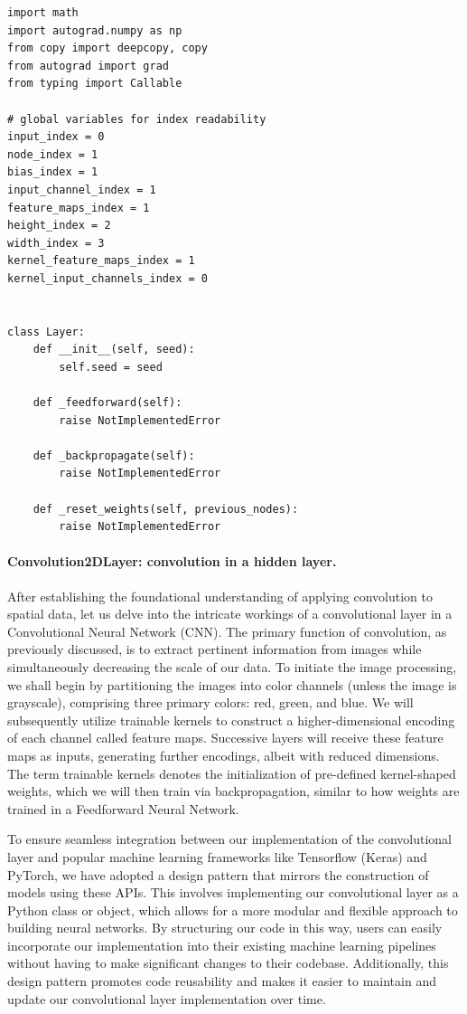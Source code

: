 \documentclass[%
oneside,                 %
final,                   %
10pt]{article}
\begin{document}
\begin{verbatim}
import math
import autograd.numpy as np
from copy import deepcopy, copy
from autograd import grad
from typing import Callable

# global variables for index readability
input_index = 0
node_index = 1
bias_index = 1
input_channel_index = 1
feature_maps_index = 1
height_index = 2
width_index = 3
kernel_feature_maps_index = 1
kernel_input_channels_index = 0


class Layer:
    def __init__(self, seed):
        self.seed = seed

    def _feedforward(self):
        raise NotImplementedError

    def _backpropagate(self):
        raise NotImplementedError

    def _reset_weights(self, previous_nodes):
        raise NotImplementedError

\end{verbatim}


\paragraph{Convolution2DLayer: convolution in a hidden layer.}
After establishing the foundational understanding of applying
convolution to spatial data, let us delve into the intricate workings
of a convolutional layer in a Convolutional Neural Network (CNN). The
primary function of convolution, as previously discussed, is to
extract pertinent information from images while simultaneously
decreasing the scale of our data. To initiate the image processing, we
shall begin by partitioning the images into color channels (unless the
image is grayscale), comprising three primary colors: red, green, and
blue. We will subsequently utilize trainable kernels to construct a
higher-dimensional encoding of each channel called feature
maps. Successive layers will receive these feature maps as inputs,
generating further encodings, albeit with reduced dimensions. The term
trainable kernels denotes the initialization of pre-defined
kernel-shaped weights, which we will then train via backpropagation,
similar to how weights are trained in a Feedforward Neural Network.

To ensure seamless integration between our implementation of the
convolutional layer and popular machine learning frameworks like
Tensorflow (Keras) and PyTorch, we have adopted a design pattern that
mirrors the construction of models using these APIs. This involves
implementing our convolutional layer as a Python class or object,
which allows for a more modular and flexible approach to building
neural networks. By structuring our code in this way, users can easily
incorporate our implementation into their existing machine learning
pipelines without having to make significant changes to their
codebase. Additionally, this design pattern promotes code reusability
and makes it easier to maintain and update our convolutional layer
implementation over time.
\end{document}
